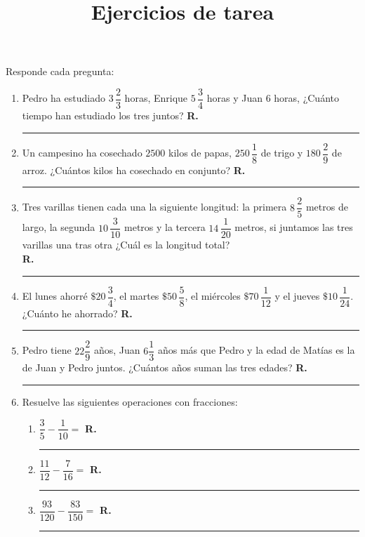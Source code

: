 

\title{Ejercicios de tarea \vspace{-2cm}}
\author{}
\date{ }



\maketitle
\fontsize{14}{14}\selectfont

Responde cada pregunta:
\begin{enumerate}
\item Pedro ha estudiado $3 \, \dfrac{2}{3}$ horas, Enrique $5 \, \dfrac{3}{4}$ horas y Juan $6$ horas, ¿Cuánto tiempo han estudiado los tres juntos? \hspace{0.3cm} \textbf{R.} \rule{3cm}{0.1mm}
\item Un campesino ha cosechado $2500$ kilos de papas, $250 \, \dfrac{1}{8}$ de trigo y $180 \,\dfrac{2}{9}$ de arroz. ¿Cuántos kilos ha cosechado en conjunto? \hspace{0.3cm} \textbf{R.} \rule{3cm}{0.1mm}
\item Tres varillas tienen cada una la siguiente longitud: la primera $8 \,\dfrac{2}{5}$ metros de largo, la segunda $10 \,\dfrac{3}{10}$ metros y la tercera $14 \,\dfrac{1}{20}$ metros, si juntamos las tres varillas una tras otra ¿Cuál es la longitud total? \\ 
\hspace{0.3cm} \textbf{R.} \rule{3cm}{0.1mm}
\item El lunes ahorré $\$ 20 \, \dfrac{3}{4}$, el martes $\$ 50 \, \dfrac{5}{8}$, el miércoles $\$ 70 \, \dfrac{1}{12}$ y el jueves $\$ 10 \, \dfrac{1}{24}$. ¿Cuánto he ahorrado? \hspace{0.3cm} \textbf{R.} \rule{3cm}{0.1mm}
\item Pedro tiene $22 \dfrac{2}{9}$ años, Juan $6 \dfrac{1}{3}$ años más que Pedro y la edad de Matías es la de Juan y Pedro juntos. ¿Cuántos años suman las tres edades? \textbf{R.} \rule{3cm}{0.1mm}
\item Resuelve las siguientes operaciones con fracciones:
\begin{enumerate}[label=\alph*)]
\item $\dfrac{3}{5} - \dfrac{1}{10} =$ \textbf{R.} \rule{3cm}{0.1mm} 
\item $\dfrac{11}{12} - \dfrac{7}{16} =$ \textbf{R.} \rule{3cm}{0.1mm} 
\item $\dfrac{93}{120} - \dfrac{83}{150} =$ \textbf{R.} \rule{3cm}{0.1mm} 

\end{enumerate}
\end{enumerate}
